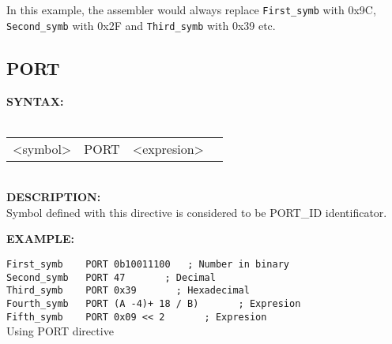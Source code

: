             In this example, the assembler would always replace {\color{highlight_symbol}\verb'First_symb'} with 0x9C,
            {\color{highlight_symbol}\verb'Second_symb'} with 0x2F and {\color{highlight_symbol}\verb'Third_symb'} with 0x39 etc.

                \subsection{PORT}
                \textbf{SYNTAX:}\\
                                \\ {
                                        \texttt{}
                                        \begin{tabular}[h!]{llll}
                                        { \color{highlight_symbol} <symbol> }  &
                                        { \color{highlight_directive} PORT } &
                                        { \color{highlight_constant} <expresion> } & { \color{highlight_comment}  }\\
                                        \end{tabular}
                                }
                                \\
                \textbf{DESCRIPTION:}\\
                Symbol defined with this directive is considered to be PORT\_ID identificator.

                \textbf{EXAMPLE:}\\
                \begin{code}[h!]
                \mysmallfont{}
                            {\color{highlight_constant}\verb'First_symb'}\verb'    '{\color{highlight_directive}\verb'PORT'}\verb' '{\color{highlight_bin}\verb'0b10011100'}\verb'   '{\color{highlight_comment}\verb'; Number in binary'}\\
                            {\color{highlight_constant}\verb'Second_symb'}\verb'   '{\color{highlight_directive}\verb'PORT'}\verb' '{\color{highlight_oct}\verb'47'}\verb'       '{\color{highlight_comment}\verb'; Decimal'}\\
                            {\color{highlight_constant}\verb'Third_symb'}\verb'    '{\color{highlight_directive}\verb'PORT'}\verb' '{\color{highlight_dec}\verb'0x39'}\verb'       '{\color{highlight_comment}\verb'; Hexadecimal'}\\
                            {\color{highlight_constant}\verb'Fourth_symb'}\verb'   '{\color{highlight_directive}\verb'PORT'}\verb' '{\color{highlight_dec}\verb'(A -4)+ 18 / B)'}\verb'       '{\color{highlight_comment}\verb'; Expresion'}\\
                            {\color{highlight_constant}\verb'Fifth_symb'}\verb'    '{\color{highlight_directive}\verb'PORT'}\verb' '{\color{highlight_dec}\verb'0x09 << 2'}\verb'       '{\color{highlight_comment}\verb'; Expresion'}\\
              \caption{Using PORT directive}
                \end{code}

